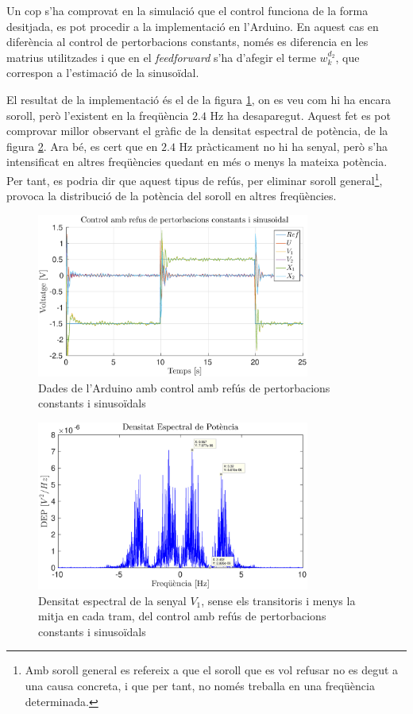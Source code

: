 \documentclass[12pt,a4paper,final,twoside,openright]{report}
\begin{document}
Un cop s'ha comprovat en la simulació que el control funciona de la forma desitjada, es pot procedir a la implementació en l'Arduino. En aquest cas en diferència al control de pertorbacions constants, només es diferencia en les matrius utilitzades i que en el \textit{feedforward} s'ha d'afegir el terme $w_k^{d_2}$, que correspon a l'estimació de la sinusoïdal. 

El resultat de la implementació és el de la figura \ref{fig:pert_sin_ct_pols_imag}, on es veu com hi ha encara soroll, però l'existent en la freqüència $2.4$ Hz ha desaparegut. Aquest fet es pot comprovar millor observant el gràfic de la densitat espectral de potència, de la figura \ref{fig:power_spectral_nomean_pert_sin_pols_imag}. Ara bé, es cert que en $2.4$ Hz pràcticament no hi ha senyal, però s'ha intensificat en altres freqüències quedant en més o menys la mateixa potència. Per tant, es podria dir que aquest tipus de refús, per eliminar soroll general\footnote{Amb soroll general es refereix a que el soroll que es vol refusar no es degut a una causa concreta, i que per tant, no només treballa en una freqüència determinada.}, provoca la distribució de la potència del soroll en altres freqüències.

\begin{figure}[h]
\centering
\includegraphics[width=0.8\textwidth]{Imatges/pert_sin_ct_pols_imag.eps}
\caption{Dades de l'Arduino amb control amb refús de pertorbacions constants i sinusoïdals\label{fig:pert_sin_ct_pols_imag}}
\end{figure}

\begin{figure}[h]
\centering
\includegraphics[width=0.8\textwidth]{Imatges/power_spectral_nomean_pert_sin_pols_imag.eps}
\caption{Densitat espectral de la senyal $V_1$, sense els transitoris i menys la mitja en cada tram, del control amb refús de pertorbacions constants i sinusoïdals\label{fig:power_spectral_nomean_pert_sin_pols_imag}}
\end{figure}
\end{document}
